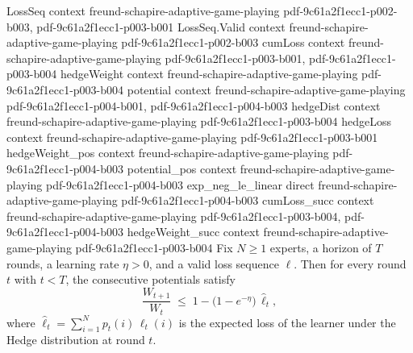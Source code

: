 \begin{lemma}
\label{potential_ratio_le}
\leanok
{}
\proofstep
  {LossSeq}
  {context}
  {freund-schapire-adaptive-game-playing}
  {pdf-9c61a2f1ecc1-p002-b003,
    pdf-9c61a2f1ecc1-p003-b001}
\proofstep
  {LossSeq.Valid}
  {context}
  {freund-schapire-adaptive-game-playing}
  {pdf-9c61a2f1ecc1-p002-b003}
\proofstep
  {cumLoss}
  {context}
  {freund-schapire-adaptive-game-playing}
  {pdf-9c61a2f1ecc1-p003-b001,
    pdf-9c61a2f1ecc1-p003-b004}
\proofstep
  {hedgeWeight}
  {context}
  {freund-schapire-adaptive-game-playing}
  {pdf-9c61a2f1ecc1-p003-b004}
\proofstep
  {potential}
  {context}
  {freund-schapire-adaptive-game-playing}
  {pdf-9c61a2f1ecc1-p004-b001,
    pdf-9c61a2f1ecc1-p004-b003}
\proofstep
  {hedgeDist}
  {context}
  {freund-schapire-adaptive-game-playing}
  {pdf-9c61a2f1ecc1-p003-b004}
\proofstep
  {hedgeLoss}
  {context}
  {freund-schapire-adaptive-game-playing}
  {pdf-9c61a2f1ecc1-p003-b001}
\proofstep
  {hedgeWeight_pos}
  {context}
  {freund-schapire-adaptive-game-playing}
  {pdf-9c61a2f1ecc1-p004-b003}
\proofstep
  {potential_pos}
  {context}
  {freund-schapire-adaptive-game-playing}
  {pdf-9c61a2f1ecc1-p004-b003}
\proofstep
  {exp_neg_le_linear}
  {direct}
  {freund-schapire-adaptive-game-playing}
  {pdf-9c61a2f1ecc1-p004-b003}
\proofstep
  {cumLoss_succ}
  {context}
  {freund-schapire-adaptive-game-playing}
  {pdf-9c61a2f1ecc1-p003-b004,
    pdf-9c61a2f1ecc1-p004-b003}
\proofstep
  {hedgeWeight_succ}
  {context}
  {freund-schapire-adaptive-game-playing}
  {pdf-9c61a2f1ecc1-p003-b004}
Fix $N \ge 1$ experts, a horizon of $T$ rounds, a learning rate $\eta > 0$, and a valid
loss sequence $\ell$. Then for every round $t$ with $t < T$, the consecutive potentials
satisfy
\[
  \frac{W_{t+1}}{W_t} \;\le\; 1 - \bigl(1 - e^{-\eta}\bigr)\,\widehat{\ell}_t,
\]
where $\widehat{\ell}_t = \sum_{i=1}^{N} p_t(i)\,\ell_t(i)$ is the expected loss of the
learner under the Hedge distribution at round $t$.
\end{lemma}

